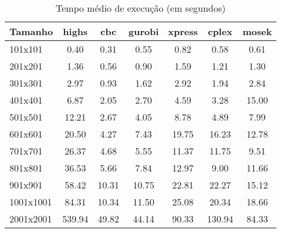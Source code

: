 \begin{table}[htbp]
\centering
\caption{Tempo médio de execução (em segundos)}
\label{tab:tempo_execucao}
\begin{tabular}{lcccccc}
\toprule
Tamanho & highs & cbc & gurobi & xpress & cplex & mosek \\
\midrule
101x101 & 0.40 & 0.31 & 0.55 & 0.82 & 0.58 & 0.61 \\
201x201 & 1.36 & 0.56 & 0.90 & 1.59 & 1.21 & 1.30 \\
301x301 & 2.97 & 0.93 & 1.62 & 2.92 & 1.94 & 2.84 \\
401x401 & 6.87 & 2.05 & 2.70 & 4.59 & 3.28 & 15.00 \\
501x501 & 12.21 & 2.67 & 4.05 & 8.78 & 4.89 & 7.99 \\
601x601 & 20.50 & 4.27 & 7.43 & 19.75 & 16.23 & 12.78 \\
701x701 & 26.37 & 4.68 & 5.55 & 11.37 & 11.75 & 9.51 \\
801x801 & 36.53 & 5.66 & 7.84 & 12.97 & 9.00 & 11.66 \\
901x901 & 58.42 & 10.31 & 10.75 & 22.81 & 22.27 & 15.12 \\
1001x1001 & 84.31 & 10.34 & 11.50 & 25.08 & 20.34 & 18.66 \\
2001x2001 & 539.94 & 49.82 & 44.14 & 90.33 & 130.94 & 84.33 \\
\bottomrule
\end{tabular}
\end{table}